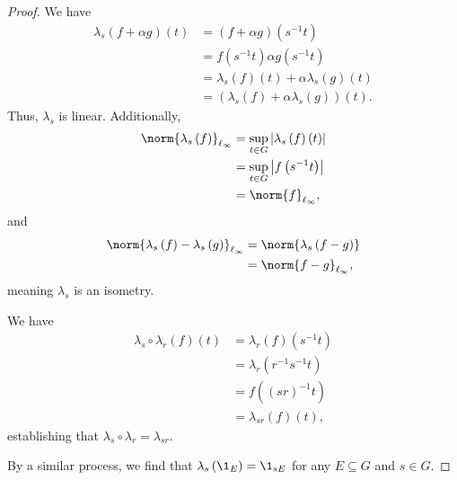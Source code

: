 \begin{proof}
  We have
  \begin{align*}
    \lambda_s\left(f + \alpha g\right)\left(t\right) &= \left(f + \alpha g\right) \left(s^{-1}t\right)\\
                                                     &= f\left(s^{-1}t\right) \alpha g\left(s^{-1}t\right)\\
                                                     &= \lambda_s\left(f\right)\left(t\right) + \alpha \lambda_s\left(g\right)\left(t\right)\\
                                                     &= \left(\lambda_s\left(f\right) + \alpha \lambda_s\left(g\right)\right)(t).
  \end{align*}
  Thus, $\lambda_s$ is linear. Additionally,
  \begin{align*}
    \norm{\lambda_s\left(f\right)}_{\ell_{\infty}} &= \sup_{t\in G}\left\vert \lambda_s\left(f\right)\left(t\right) \right\vert\\
                                   &= \sup_{t\in G}\left\vert f\left(s^{-1}t\right) \right\vert\\
                                   &= \norm{f}_{\ell_{\infty}},
  \end{align*}
  and
  \begin{align*}
    \norm{\lambda_s\left(f\right) - \lambda_s\left(g\right)}_{\ell_{\infty}} &= \norm{\lambda_s\left(f-g\right)}\\
                                                                             &= \norm{f-g}_{\ell_{\infty}},
  \end{align*}
  meaning $\lambda_s$ is an isometry.\newline

  We have
  \begin{align*}
    \lambda_s\circ \lambda_r\left(f\right)\left(t\right) &= \lambda_r\left(f\right)\left(s^{-1}t\right)\\
                                                         &= \lambda_r\left(r^{-1}s^{-1}t\right)\\
                                                         &= f\left(\left(sr\right)^{-1}t\right)\\
                                                         &= \lambda_{sr}\left(f\right)\left(t\right),
  \end{align*}
  establishing that $\lambda_s\circ \lambda_r = \lambda_{sr}$.\newline

  By a similar process, we find that $\lambda_{s}\left(\1_{E}\right) = \1_{sE}$ for any $E\subseteq G$ and $s\in G$.
\end{proof}
